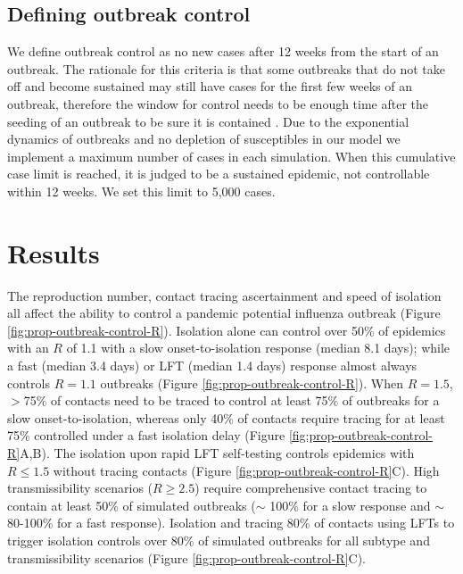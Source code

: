 \documentclass{article}
\begin{document}
\subsection*{Defining outbreak control}

We define outbreak control as no new cases after 12 weeks from the start of an outbreak. The rationale for this criteria is that some outbreaks that do not take off and become sustained may still have cases for the first few weeks of an outbreak, therefore the window for control needs to be enough time after the seeding of an outbreak to be sure it is contained \citep{hellewellFeasibilityControllingCOVID192020}. Due to the exponential dynamics of outbreaks and no depletion of susceptibles in our model we implement a maximum number of cases in each simulation. When this cumulative case limit is reached, it is judged to be a sustained epidemic, not controllable within 12 weeks. We set this limit to 5,000 cases.

\section*{Results}

The reproduction number, contact tracing ascertainment and speed of isolation all affect the ability to control a pandemic potential influenza outbreak (Figure \ref{fig:prop-outbreak-control-R}). Isolation alone can control over 50\% of epidemics with an $R$ of 1.1 with a slow onset-to-isolation response (median 8.1 days); while a fast (median 3.4 days) or LFT (median 1.4 days) response almost always controls $R = 1.1$ outbreaks (Figure \ref{fig:prop-outbreak-control-R}). When $R = 1.5$, $>$75\% of contacts need to be traced to control at least 75\% of outbreaks for a slow onset-to-isolation, whereas only 40\% of contacts require tracing for at least 75\% controlled under a fast isolation delay (Figure \ref{fig:prop-outbreak-control-R}A,B). The isolation upon rapid LFT self-testing controls epidemics with $R \leq 1.5$ without tracing contacts (Figure \ref{fig:prop-outbreak-control-R}C). High transmissibility scenarios ($R \geq 2.5$) require comprehensive contact tracing to contain at least 50\% of simulated outbreaks ($\sim$ 100\% for a slow response and $\sim$ 80-100\% for a fast response). Isolation and tracing 80\% of contacts using LFTs to trigger isolation controls over 80\% of simulated outbreaks for all subtype and transmissibility scenarios (Figure \ref{fig:prop-outbreak-control-R}C). \\
\end{document}
